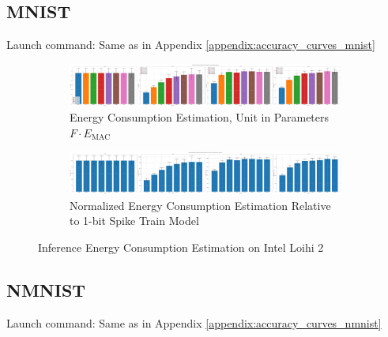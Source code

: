     \subsection{MNIST}
    \label{appendix:energy_neuromorphic_mnist}
        Launch command: Same as in Appendix \ref{appendix:accuracy_curves_mnist}

        \begin{figure}[H]
            \centering
            \begin{subfigure}[H]{\textwidth}
                \includegraphics[width=\textwidth]{../standard/MNIST/plots/mnist_test_energy_nh.pdf}
                \caption{Energy Consumption Estimation, Unit in Parameters $F\cdot E_{\text{MAC}}$}
            \end{subfigure}
            \hfill
            \begin{subfigure}[H]{\textwidth}
                \includegraphics[width=\textwidth]{../standard/MNIST/plots/mnist_test_relative_energy_nh.pdf}
                \caption{Normalized Energy Consumption Estimation Relative to 1-bit Spike Train Model}
            \end{subfigure}
            \caption{Inference Energy Consumption Estimation on Intel Loihi 2}
        \end{figure}

    \subsection{NMNIST}
    \label{appendix:energy_neuromorphic_nmnist}
        Launch command: Same as in Appendix \ref{appendix:accuracy_curves_nmnist}

